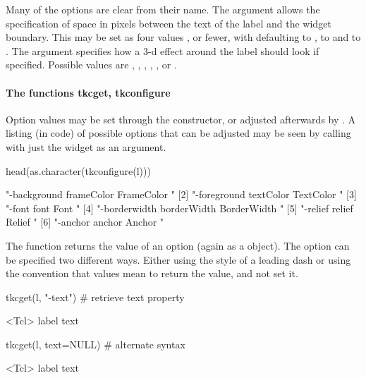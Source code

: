 Many of the options are clear from their name.  The
 argument allows the specification of
space in pixels between the text of the label and the widget
boundary. This may be set as four values , or fewer, with  defaulting to ,  to  and
 to . The  argument specifies how a
3-d effect around the label should look if specified. Possible values
are , , , , , or .

\paragraph{The functions tkcget, tkconfigure}

Option values may be set through the constructor, or adjusted
afterwards by . A listing (in \TCL\/ code) of possible options
that can be adjusted may be seen by calling 
with just the widget as an argument.

\begin{Schunk}
\begin{Sinput}
 head(as.character(tkconfigure(l)))
\end{Sinput}
\begin{Soutput}
[1] "-background frameColor FrameColor {} {}"   
[2] "-foreground textColor TextColor {} {}"     
[3] "-font font Font {} {}"                     
[4] "-borderwidth borderWidth BorderWidth {} {}"
[5] "-relief relief Relief {} {}"               
[6] "-anchor anchor Anchor {} {}"               
\end{Soutput}
\end{Schunk}

The  function returns the value of an
option (again as a  object). The option can be specified
two different ways. Either using the \TK\/ style of a leading dash or
using the convention that  values mean to return the value,
and not set it.


\begin{Schunk}
\begin{Sinput}
 tkcget(l, "-text")                      # retrieve text property
\end{Sinput}
\begin{Soutput}
<Tcl> label text 
\end{Soutput}
\begin{Sinput}
 tkcget(l, text=NULL)                    # alternate syntax
\end{Sinput}
\begin{Soutput}
<Tcl> label text 
\end{Soutput}
\end{Schunk}

